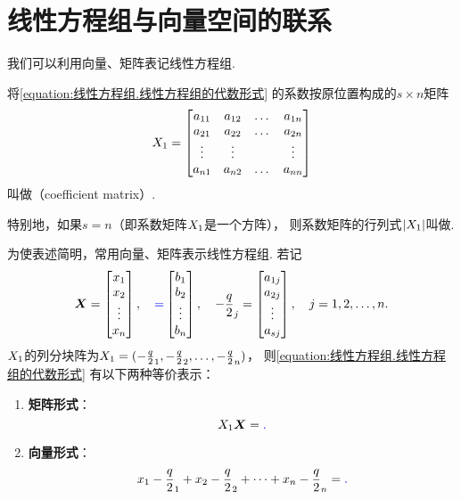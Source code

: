 \section{线性方程组与向量空间的联系}
我们可以利用向量、矩阵表记线性方程组.

\begin{definition}
将\cref{equation:线性方程组.线性方程组的代数形式} 的系数按原位置构成的\(s \times n\)矩阵\[
	X_1 = \begin{bmatrix}
		a_{11} & a_{12} & \dots & a_{1n} \\
		a_{21} & a_{22} & \dots & a_{2n} \\
		\vdots & \vdots & & \vdots \\
		a_{n1} & a_{n2} & \dots & a_{nn}
	\end{bmatrix}
\]叫做（coefficient matrix）.

特别地，如果\(s = n\)（即系数矩阵\(X_1\)是一个方阵），
则系数矩阵的行列式\(\abs{X_1}\)叫做.
\end{definition}

为使表述简明，常用向量、矩阵表示线性方程组.
若记\[
	\boldsymbol{X}=\begin{bmatrix}
		x_1 \\ x_2 \\ \vdots \\ x_n
	\end{bmatrix},
	\quad
	\textcolor{blue}=\begin{bmatrix}
		b_1 \\ b_2 \\ \vdots \\ b_n
	\end{bmatrix},
	\quad
	-\frac{q}{2}_j=\begin{bmatrix}
		a_{1j} \\ a_{2j} \\ \vdots \\ a_{sj}
	\end{bmatrix},
	\quad
	j=1,2,\dotsc,n.
\]
\(X_1\)的列分块阵为\(X_1 = (-\frac{q}{2}_1,-\frac{q}{2}_2,\dotsc,-\frac{q}{2}_n)\)，
则\cref{equation:线性方程组.线性方程组的代数形式} 有以下两种等价表示：
\begin{enumerate}
	\item {\bf 矩阵形式}：
	\begin{equation}
		X_1 \boldsymbol{X} = \textcolor{blue}.
	\end{equation}
	\item {\bf 向量形式}：
	\begin{equation}
		x_1 -\frac{q}{2}_1 + x_2 -\frac{q}{2}_2 + \dotsb + x_n -\frac{q}{2}_n = \textcolor{blue}.
	\end{equation}
\end{enumerate}




